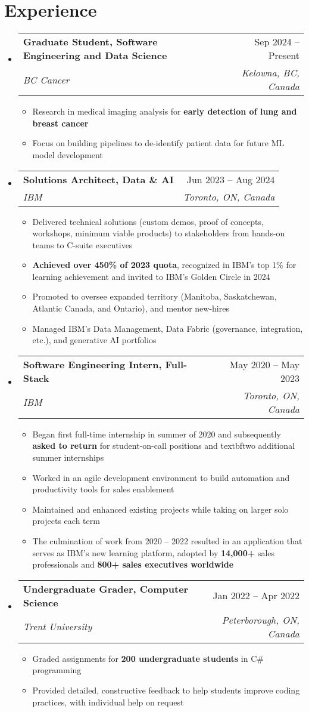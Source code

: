 \documentclass[letterpaper,11.5pt]{article}
\makeatletter
\newcommand{\resumeItem}[1]{
  \item\small{
    {#1 \vspace{-2pt}}
  }
}
\newcommand{\resumeSubheading}[4]{
  \vspace{-2pt}\item
    \begin{tabular*}{0.97\textwidth}[t]{l@{\extracolsep{\fill}}r}
      \textbf{#1} & #2 \\
      \textit{\small#3} & \textit{\small #4} \\
    \end{tabular*}\vspace{-7pt}
}
\newcommand{\resumeSubHeadingListStart}{\begin{itemize}[leftmargin=0.15in, label={}]}
\newcommand{\resumeSubHeadingListEnd}{\end{itemize}}
\newcommand{\resumeItemListStart}{\begin{itemize}}
\newcommand{\resumeItemListEnd}{\end{itemize}\vspace{-5pt}}
\makeatother
\begin{document}
\section{Experience}
  \resumeSubHeadingListStart
    \resumeSubheading
      {Graduate Student, Software Engineering and Data Science}{Sep 2024 -- Present}
      {BC Cancer}{Kelowna, BC, Canada}
      \resumeItemListStart
        \resumeItem{Research in medical imaging analysis for \textbf{early detection of lung and breast cancer}}
        \resumeItem{Focus on building pipelines to de-identify patient data for future ML model development}
      \resumeItemListEnd
    \resumeSubheading
      {Solutions Architect, Data \& AI}{Jun 2023 -- Aug 2024}
      {IBM}{Toronto, ON, Canada}
      \resumeItemListStart
        \resumeItem{Delivered technical solutions (custom demos, proof of concepts, workshops, minimum viable products) to stakeholders from hands-on teams to C-suite executives}
        \resumeItem{\textbf{Achieved over 450\% of 2023 quota}, recognized in IBM's top 1\% for learning achievement and invited to IBM's Golden Circle in 2024}
        \resumeItem{Promoted to oversee expanded territory (Manitoba, Saskatchewan, Atlantic Canada, and Ontario), and mentor new-hires}
        \resumeItem{Managed IBM's Data Management, Data Fabric (governance, integration, etc.), and generative AI portfolios}
      \resumeItemListEnd
    \resumeSubheading
      {Software Engineering Intern, Full-Stack}{May 2020 -- May 2023}
      {IBM}{Toronto, ON, Canada}
      \resumeItemListStart
        \resumeItem{Began first full-time internship in summer of 2020 and subsequently \textbf{asked to return} for student-on-call positions and textbf{two additional} summer internships}
        \resumeItem{Worked in an agile development environment to build automation and productivity tools for sales enablement}
        \resumeItem{Maintained and enhanced existing projects while taking on larger solo projects each term}
        \resumeItem{The culmination of work from 2020 -- 2022 resulted in an application that serves as IBM's new learning platform, adopted by \textbf{14,000+} sales professionals and \textbf{800+ sales executives worldwide}}
      \resumeItemListEnd
      \resumeSubheading
      {Undergraduate Grader, Computer Science}{Jan 2022 -- Apr 2022}
      {Trent University}{Peterborough, ON, Canada}
      \resumeItemListStart
        \resumeItem{Graded assignments for \textbf{200 undergraduate students} in C\# programming}
        \resumeItem{Provided detailed, constructive feedback to help students improve coding practices, with individual help on request}
      \resumeItemListEnd
  \resumeSubHeadingListEnd
\end{document}
